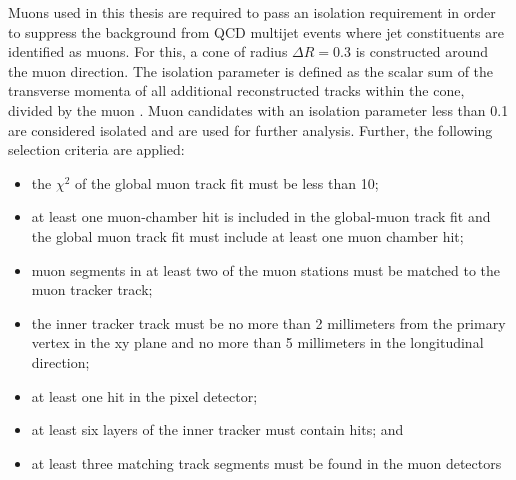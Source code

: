 Muons used in this thesis are required to pass an isolation requirement in order to suppress the background from QCD multijet events where jet constituents are identified as muons. For this, a cone of radius $\Delta R = 0.3$ is constructed around the muon direction. The isolation parameter is defined as the scalar sum of the transverse momenta of all additional reconstructed tracks within the cone, divided by the muon \PT{}. Muon candidates with an isolation parameter less
than 0.1 are considered isolated and are used for further analysis. \newline
Further, the following selection criteria are applied:
\begin{itemize}
  \itemsep0em 
  \item the $\chi^2$ of the global muon track fit must be less than 10;
  \item at least one muon-chamber hit is included in the global-muon track fit and the global muon track fit must include at least one muon chamber hit;
  \item muon segments in at least two of the muon stations must be matched to the muon tracker track;  
  \item the inner tracker track must be no more than 2 millimeters from the primary vertex in the xy plane and no more than 5 millimeters in the longitudinal direction;
 \item at least one hit in the pixel detector;
 \item at least six layers of the inner tracker must contain hits; and
 \item at least three matching track segments must be found in the
muon detectors
\end{itemize}


